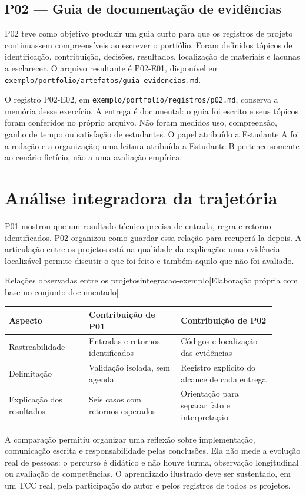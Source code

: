 \section{P02 --- Guia de documentação de evidências}
P02 teve como objetivo produzir um guia curto para que os registros de projeto
continuassem compreensíveis ao escrever o portfólio. Foram definidos tópicos
de identificação, contribuição, decisões, resultados, localização de materiais
e lacunas a esclarecer. O arquivo resultante é P02-E01, disponível em
\texttt{exemplo/portfolio/artefatos/guia-evidencias.md}.

O registro P02-E02, em \texttt{exemplo/portfolio/registros/p02.md}, conserva a
memória desse exercício. A entrega é documental: o guia foi escrito e seus
tópicos foram conferidos no próprio arquivo. Não foram medidos uso, compreensão,
ganho de tempo ou satisfação de estudantes. O papel atribuído a Estudante A
foi a redação e a organização; uma leitura atribuída a Estudante B pertence
somente ao cenário fictício, não a uma avaliação empírica.

\chapter{Análise integradora da trajetória}
P01 mostrou que um resultado técnico precisa de entrada, regra e retorno
identificados. P02 organizou como guardar essa relação para recuperá-la depois.
A articulação entre os projetos está na qualidade da explicação: uma evidência
localizável permite discutir o que foi feito e também aquilo que não foi avaliado.

\begin{undftabela}[H]{Relações observadas entre os projetos}{integracao-exemplo}[Elaboração própria com base no conjunto documentado]
\begin{tabular}{@{}p{0.27\linewidth}p{0.31\linewidth}p{0.32\linewidth}@{}}
\hline
\textbf{Aspecto} & \textbf{Contribuição de P01} & \textbf{Contribuição de P02} \\
\hline
Rastreabilidade & Entradas e retornos identificados & Códigos e localização das evidências \\
Delimitação & Validação isolada, sem agenda & Registro explícito do alcance de cada entrega \\
Explicação dos resultados & Seis casos com retornos esperados & Orientação para separar fato e interpretação \\
\hline
\end{tabular}
\end{undftabela}
A comparação permitiu organizar uma reflexão sobre implementação, comunicação
escrita e responsabilidade pelas conclusões. Ela não mede a evolução real de
pessoas: o percurso é didático e não houve turma, observação longitudinal ou
avaliação de competências. O aprendizado ilustrado deve ser sustentado, em um
TCC real, pela participação do autor e pelos registros de todos os projetos.

